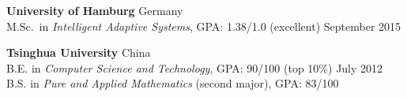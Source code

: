 \documentclass[a4paper,9pt]{extarticle} %
\newcommand{\ind}{\hspace*{1em}}
\begin{document}
\parbox{\textwidth}{%
\textbf{University of Hamburg} \hfill Germany \\
\ind{} M.Sc.\ in \textit{Intelligent Adaptive Systems}, GPA\@: 1.38/1.0 (excellent)  \hfill September 2015%
}

\parbox{\textwidth}{%
\textbf{Tsinghua University} \hfill China \\
\ind{} B.E. in \textit{Computer Science and Technology}, GPA\@: 90/100 (top 10\%) \hfill July 2012 \\
\ind{} B.S. in \textit{Pure and Applied Mathematics} (second major), GPA\@: 83/100 %
}


\end{document}
